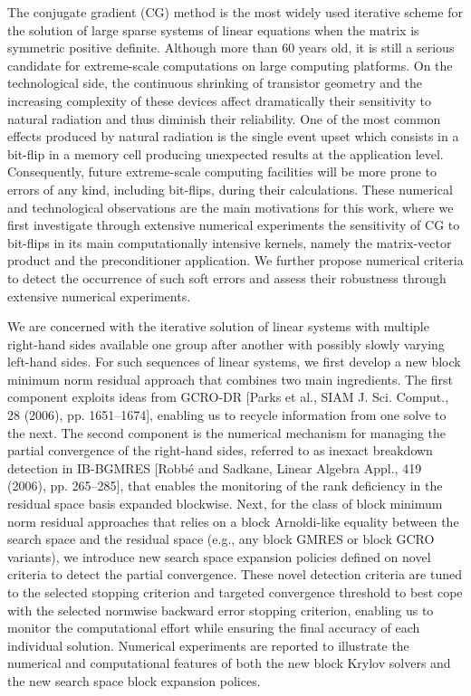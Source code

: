 \begin{description}
    The conjugate gradient (CG) method is the most widely used iterative scheme for the solution of large sparse systems of linear equations when the matrix is symmetric positive definite. Although more than 60 years old, it is still a serious candidate for extreme-scale computations on large computing platforms. On the technological side, the continuous shrinking of transistor geometry and the increasing complexity of these devices affect dramatically their sensitivity to natural radiation and thus diminish their reliability. One of the most common effects produced by natural radiation is the single event upset which consists in a bit-flip in a memory cell producing unexpected results at the application level. Consequently, future extreme-scale computing facilities will be more prone to errors of any kind, including bit-flips, during their calculations. These numerical and technological observations are the main motivations for this work, where we first investigate through extensive numerical experiments the sensitivity of CG to bit-flips in its main computationally intensive kernels, namely the matrix-vector product and the preconditioner application. We further propose numerical criteria to detect the occurrence of such soft errors and assess their robustness through extensive numerical experiments.
    \item[\fullcite{giraud_block_2022}]
        We are concerned with the iterative solution of linear systems with multiple right-hand sides available one group after another with possibly slowly varying left-hand sides. For such sequences of linear systems, we first develop a new block minimum norm residual approach that combines two main ingredients. The first component exploits ideas from GCRO-DR [Parks et al., SIAM J. Sci. Comput., 28 (2006), pp. 1651--1674], enabling us to recycle information from one solve to the next. The second component is the numerical mechanism for managing the partial convergence of the right-hand sides, referred to as inexact breakdown detection in IB-BGMRES [Robbé and Sadkane, Linear Algebra Appl., 419 (2006), pp. 265--285], that enables the monitoring of the rank deficiency in the residual space basis expanded blockwise. Next, for the class of block minimum norm residual approaches that relies on a block Arnoldi-like equality between the search space and the residual space (e.g., any block GMRES or block GCRO variants), we introduce new search space expansion policies defined on novel criteria to detect the partial convergence. These novel detection criteria are tuned to the selected stopping criterion and targeted convergence threshold to best cope with the selected normwise backward error stopping criterion, enabling us to monitor the computational effort while ensuring the final accuracy of each individual solution. Numerical experiments are reported to illustrate the numerical and computational features of both the new block Krylov solvers and the new search space block expansion polices.
\end{description}


